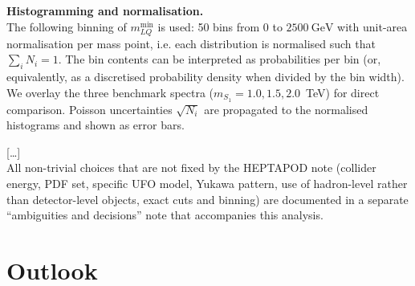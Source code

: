 \documentclass[submission, Phys]{SciPost}
\begin{document}
\begin{promptblock}
\textbf{Histogramming and normalisation.}\\
The following binning of $m_{LQ}^{\min}$ is used:
50 bins from $0$ to $2500~\text{GeV}$ with unit-area normalisation per mass point, i.e. each distribution is normalised such that $\sum_i N_i = 1$. The bin contents can be interpreted as probabilities per bin (or, equivalently, as a discretised probability density when divided by the bin width). We overlay the three benchmark spectra ($m_{S_1}=1.0,1.5,2.0$~TeV) for direct comparison. Poisson uncertainties $\sqrt{N_i}$ are propagated to the normalised histograms and shown as error bars.

[\ldots]\\
All non-trivial choices that are not fixed by the HEPTAPOD note (collider
energy, PDF set, specific UFO model, Yukawa pattern, use of hadron-level
rather than detector-level objects, exact cuts and binning) are documented in a
separate ``ambiguities and decisions'' note that accompanies this analysis.
\end{promptblock}


\clearpage
\section{Outlook}
\label{sec:outlook}
\end{document}
